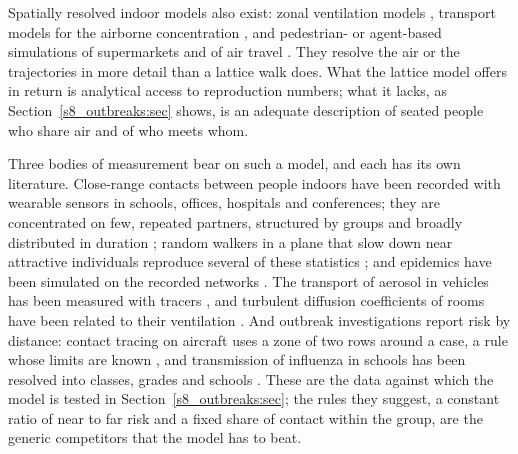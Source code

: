 Spatially resolved indoor models also exist: zonal ventilation models \citep{noakes2009mathematical},
transport models for the airborne concentration \citep{lau2022predicting,vuorinen2020modelling}, and
pedestrian- or agent-based simulations of supermarkets and of air travel
\citep{ying2021modelling,namilae2017multiscale}. They resolve the air or the trajectories in more detail than a
lattice walk does. What the lattice model offers in return is analytical access to reproduction numbers; what
it lacks, as Section~\ref{s8_outbreaks:sec} shows, is an adequate description of seated people who share air
and of who meets whom.

Three bodies of measurement bear on such a model, and each has its own literature. Close-range contacts
between people indoors have been recorded with wearable sensors in schools, offices, hospitals and
conferences; they are concentrated on few, repeated partners, structured by groups and broadly distributed in
duration \citep{cattuto2010dynamics,stehle2011high,genois2015data,genois2018can}; random walkers in a plane
that slow down near attractive individuals reproduce several of these statistics
\citep{starnini2013modeling}; and epidemics have been simulated on the recorded networks
\citep{stehle2011simulation,gemmetto2014mitigation}. The transport of
aerosol in vehicles has been measured with tracers \citep{kinahan2021aerosol,woodward2022evaluation,ou2022},
and turbulent diffusion coefficients of rooms have been related to their ventilation
\citep{cheng2011modeling}. And outbreak investigations report risk by distance: contact tracing on aircraft
uses a zone of two rows around a case, a rule whose limits are known \citep{hertzberg2016risk}, and
transmission of influenza in schools has been resolved into classes, grades and schools
\citep{endo2021within}. These are the data against which the model is tested in
Section~\ref{s8_outbreaks:sec}; the rules they suggest, a constant ratio of near to far risk and a fixed share
of contact within the group, are the generic competitors that the model has to beat.

